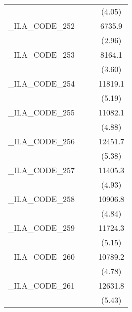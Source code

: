 {\begin{tabular}{l*{3}{c}}
            &                     &                     &      (4.05)         \\
[1em]
\_ILA\_CODE\_252&                     &                     &      6735.9\sym{**} \\
            &                     &                     &      (2.96)         \\
[1em]
\_ILA\_CODE\_253&                     &                     &      8164.1\sym{***}\\
            &                     &                     &      (3.60)         \\
[1em]
\_ILA\_CODE\_254&                     &                     &     11819.1\sym{***}\\
            &                     &                     &      (5.19)         \\
[1em]
\_ILA\_CODE\_255&                     &                     &     11082.1\sym{***}\\
            &                     &                     &      (4.88)         \\
[1em]
\_ILA\_CODE\_256&                     &                     &     12451.7\sym{***}\\
            &                     &                     &      (5.38)         \\
[1em]
\_ILA\_CODE\_257&                     &                     &     11405.3\sym{***}\\
            &                     &                     &      (4.93)         \\
[1em]
\_ILA\_CODE\_258&                     &                     &     10906.8\sym{***}\\
            &                     &                     &      (4.84)         \\
[1em]
\_ILA\_CODE\_259&                     &                     &     11724.3\sym{***}\\
            &                     &                     &      (5.15)         \\
[1em]
\_ILA\_CODE\_260&                     &                     &     10789.2\sym{***}\\
            &                     &                     &      (4.78)         \\
[1em]
\_ILA\_CODE\_261&                     &                     &     12631.8\sym{***}\\
            &                     &                     &      (5.43)         \\

\end{tabular}}
